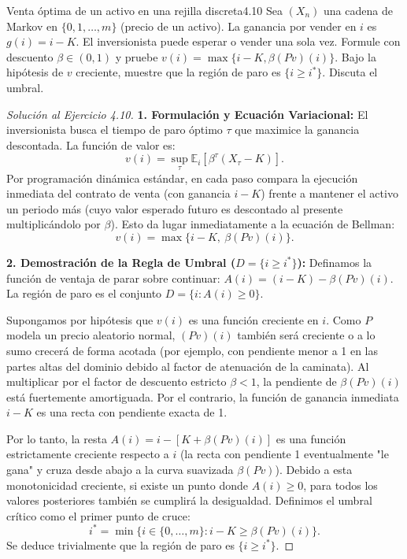 \documentclass[10pt,a4paper]{article}
\begin{document}
\begin{ejercicio}{Venta óptima de un activo en una rejilla discreta}{4.10}
    Sea $(X_n)$ una cadena de Markov en $\{0, 1, \dots, m\}$ (precio de un activo). La ganancia por vender en $i$ es $g(i) = i - K$. El inversionista puede esperar o vender una sola vez. Formule con descuento $\beta \in (0,1)$ y pruebe $v(i) = \max\{i - K, \beta(Pv)(i)\}$. Bajo la hipótesis de $v$ creciente, muestre que la región de paro es $\{i \ge i^*\}$. Discuta el umbral.
\end{ejercicio}

\begin{proof}[Solución al Ejercicio 4.10]
    \textbf{1. Formulación y Ecuación Variacional:}
    El inversionista busca el tiempo de paro óptimo $\tau$ que maximice la ganancia descontada. La función de valor es:
    \[ v(i) = \sup_\tau \mathbb{E}_i \left[ \beta^\tau (X_\tau - K) \right]. \]
    Por programación dinámica estándar, en cada paso compara la ejecución inmediata del contrato de venta (con ganancia $i-K$) frente a mantener el activo un periodo más (cuyo valor esperado futuro es descontado al presente multiplicándolo por $\beta$). Esto da lugar inmediatamente a la ecuación de Bellman:
    \[ v(i) = \max \{ i - K, \ \beta(Pv)(i) \}. \]

    \textbf{2. Demostración de la Regla de Umbral ($D = \{i \ge i^*\}$):}
    Definamos la función de ventaja de parar sobre continuar: $A(i) = (i - K) - \beta(Pv)(i)$.
    La región de paro es el conjunto $D = \{i : A(i) \ge 0\}$.
    
    Supongamos por hipótesis que $v(i)$ es una función creciente en $i$. Como $P$ modela un precio aleatorio normal, $(Pv)(i)$ también será creciente o a lo sumo crecerá de forma acotada (por ejemplo, con pendiente menor a 1 en las partes altas del dominio debido al factor de atenuación de la caminata). 
    Al multiplicar por el factor de descuento estricto $\beta < 1$, la pendiente de $\beta(Pv)(i)$ está fuertemente amortiguada. 
    Por el contrario, la función de ganancia inmediata $i - K$ es una recta con pendiente exacta de 1.
    
    Por lo tanto, la resta $A(i) = i - [K + \beta(Pv)(i)]$ es una función estrictamente creciente respecto a $i$ (la recta con pendiente 1 eventualmente "le gana" y cruza desde abajo a la curva suavizada $\beta(Pv)$).
    Debido a esta monotonicidad creciente, si existe un punto donde $A(i) \ge 0$, para todos los valores posteriores también se cumplirá la desigualdad. 
    Definimos el umbral crítico como el primer punto de cruce:
    \[ i^* = \min \{ i \in \{0, \dots, m\} : i - K \ge \beta(Pv)(i) \}. \]
    Se deduce trivialmente que la región de paro es $\{i \ge i^*\}$.


\end{proof}
\end{document}
